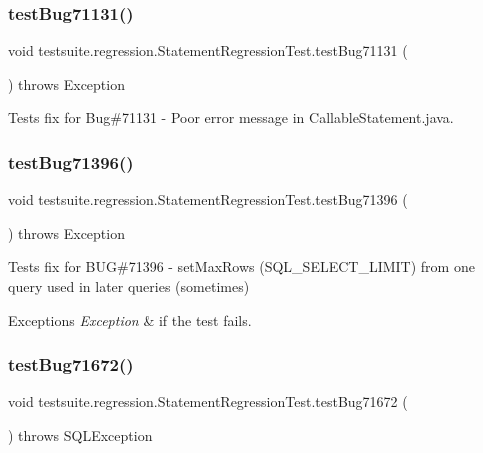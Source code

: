 \subsubsection{\texorpdfstring{test\+Bug71131()}{testBug71131()}}
{\footnotesize\ttfamily void testsuite.\+regression.\+Statement\+Regression\+Test.\+test\+Bug71131 (\begin{DoxyParamCaption}{ }\end{DoxyParamCaption}) throws Exception}

Tests fix for Bug\#71131 -\/ Poor error message in Callable\+Statement.\+java. \mbox{\label{classtestsuite_1_1regression_1_1_statement_regression_test_a716338573789cf539312a6527ddd2ea6}} 
\subsubsection{\texorpdfstring{test\+Bug71396()}{testBug71396()}}
{\footnotesize\ttfamily void testsuite.\+regression.\+Statement\+Regression\+Test.\+test\+Bug71396 (\begin{DoxyParamCaption}{ }\end{DoxyParamCaption}) throws Exception}

Tests fix for B\+UG\#71396 -\/ set\+Max\+Rows (S\+Q\+L\+\_\+\+S\+E\+L\+E\+C\+T\+\_\+\+L\+I\+M\+IT) from one query used in later queries (sometimes)


\begin{DoxyExceptions}{Exceptions}
{\em Exception} & if the test fails. \\
\hline
\end{DoxyExceptions}
\mbox{\label{classtestsuite_1_1regression_1_1_statement_regression_test_ab1d12cefc8598fc6b119554ddfe01866}} 
\subsubsection{\texorpdfstring{test\+Bug71672()}{testBug71672()}}
{\footnotesize\ttfamily void testsuite.\+regression.\+Statement\+Regression\+Test.\+test\+Bug71672 (\begin{DoxyParamCaption}{ }\end{DoxyParamCaption}) throws S\+Q\+L\+Exception}

